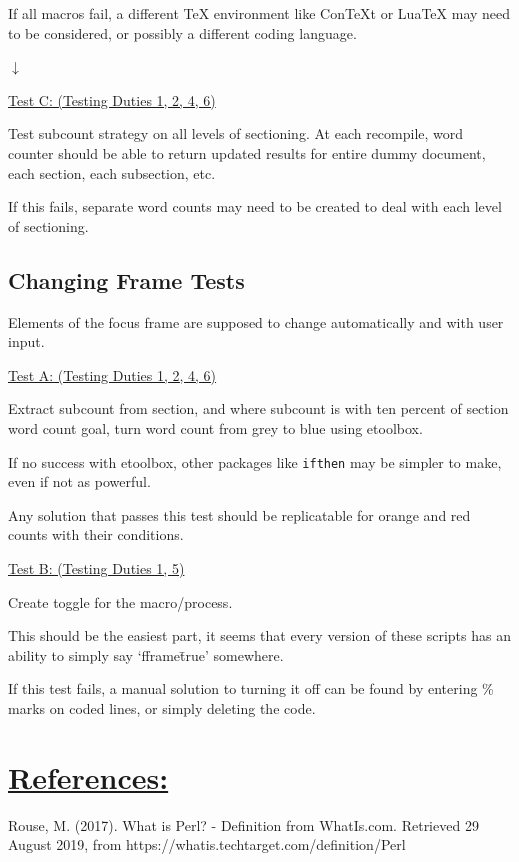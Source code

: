 \documentclass[12pt]{article}
\begin{document}
If all macros fail, a different TeX environment like ConTeXt or LuaTeX may need to be considered, or possibly a different coding language. 

$\downarrow$

\underline{Test C: (Testing Duties 1, 2, 4, 6)}

Test subcount strategy on all levels of sectioning. At each recompile, word counter should be able to return updated results for entire dummy document, each section, each subsection, etc.

If this fails, separate word counts may need to be created to deal with each level of sectioning.

\vspace{2em}
\subsection*{Changing Frame Tests}

Elements of the focus frame are supposed to change automatically and with user input.

\underline{Test A: (Testing Duties 1, 2, 4, 6)}

Extract subcount from section, and where subcount is with ten percent of section word count goal, turn word count from grey to blue using etoolbox.

If no success with etoolbox, other packages like \texttt{ifthen} may be simpler to make, even if not as powerful.

Any solution that passes this test should be replicatable for orange and red counts with their conditions.

\vspace{1em}
\underline{Test B: (Testing Duties 1, 5)}

Create toggle for the macro/process.

This should be the easiest part, it seems that every version of these scripts has an ability to simply say `fframe\=true' somewhere.

If this test fails, a manual solution to turning it off can be found by entering \% marks on coded lines, or simply deleting the code.




\vspace{3em}
\section*{\underline{\textbf{\Large References:}}}

Rouse, M. (2017). What is Perl? - Definition from WhatIs.com. Retrieved 29 August 2019, from https://whatis.techtarget.com/definition/Perl
\end{document}
